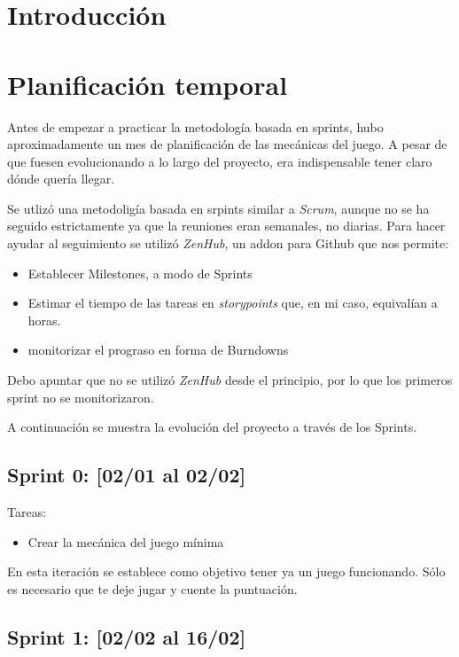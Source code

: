 
\section{Introducción}



\section{Planificación temporal}

Antes de empezar a practicar la metodología basada en sprints, hubo aproximadamente un mes de planificación de las mecánicas del juego. A pesar de que fuesen evolucionando a lo largo del proyecto, era indispensable tener claro dónde quería llegar.

Se utlizó una metodoligía basada en srpints similar a \emph{Scrum}, aunque no se ha seguido estrictamente ya que la reuniones eran semanales, no diarias. Para hacer ayudar al seguimiento se utilizó \emph{ZenHub}, un addon para Github que nos permite:
\begin{itemize}
    \item Establecer Milestones, a modo de Sprints
    \item Estimar el tiempo de las tareas en \emph{storypoints} que, en mi caso, equivalían a horas.
    \item monitorizar el prograso en forma de Burndowns
\end{itemize}

Debo apuntar que no se utilizó \emph{ZenHub}  desde el principio, por lo que los primeros sprint no se monitorizaron.


A continuación se muestra la evolución del proyecto a través de los Sprints.

\subsection{Sprint 0: [02/01 al 02/02] }
Tareas:
\begin{itemize}
    \item Crear la mecánica del juego mínima
\end{itemize}


En esta iteración se establece como objetivo tener ya un juego funcionando. Sólo es necesario que te deje jugar y cuente la puntuación.

\subsection{Sprint 1: [02/02 al 16/02]}

